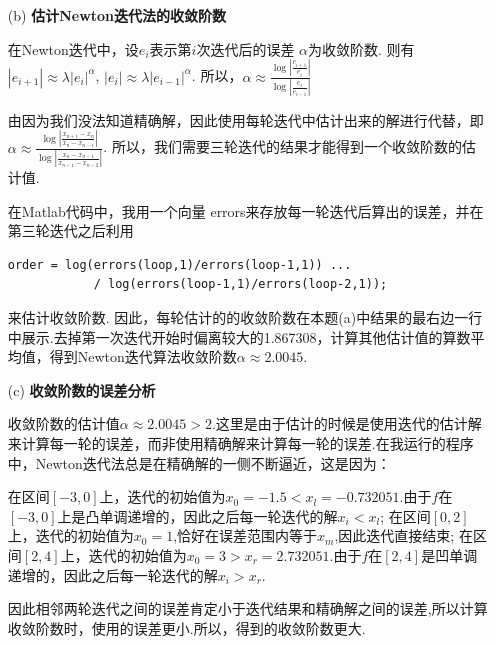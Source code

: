 \documentclass[12pt,a4paper,utf8]{ctexart}
\begin{document}
\begin{enumerate}
\begin{itemize}
    \item[(b)] \textbf{估计Newton迭代法的收敛阶数}
    \par
    在Newton迭代中，设$e_i$表示第$i$次迭代后的误差 $\alpha$为收敛阶数.
    则有 $ \left| e_{i+1} \right|  \approx \lambda { \left| e_{i} \right|} ^ \alpha$,
    $ \left| e_{i} \right|  \approx \lambda {\left| e_{i-1} \right|} ^ \alpha$.
    所以，$\alpha \approx \frac{ \log{ \left| \frac{e_{i+1}}{e_i} \right|} }
        { \log{ \left| \frac{e_{i}}{e_{i-1}} \right|} }$
    \par
    由因为我们没法知道精确解，因此使用每轮迭代中估计出来的解进行代替，即
    $\alpha \approx \frac{ \log{ \left| \frac{ x_{n+1} - x_n }{x_n - x_{n-1}} \right|} }
        { \log{ \left| \frac{x_n - x_{n-1}}{x_{n-1} - x_{n-2}} \right|} }$.
    所以，我们需要三轮迭代的结果才能得到一个收敛阶数的估计值.
    \par
    在Matlab代码中，我用一个向量
    errors来存放每一轮迭代后算出的误差，并在第三轮迭代之后利用
\begin{lstlisting}
order = log(errors(loop,1)/errors(loop-1,1)) ...
            / log(errors(loop-1,1)/errors(loop-2,1));
\end{lstlisting}
    来估计收敛阶数.
    因此，每轮估计的的收敛阶数在本题(a)中结果的最右边一行中展示.去掉第一次迭代开始时偏离较大的1.867308，计算其他估计值的算数平均值，得到Newton迭代算法收敛阶数$\alpha \approx 2.0045$.

    \item[(c)] \textbf{收敛阶数的误差分析}
    \par 
    收敛阶数的估计值$\alpha \approx 2.0045 > 2$.这里是由于估计的时候是使用迭代的估计解来计算每一轮的误差，而非使用精确解来计算每一轮的误差.在我运行的程序中，Newton迭代法总是在精确解的一侧不断逼近，这是因为：
    \par
    在区间$[-3,0]$上，迭代的初始值为$x_0 = -1.5 < x_l = -0.732051$.由于$f$在$[-3,0]$上是凸单调递增的，因此之后每一轮迭代的解$x_i < x_l$;
    在区间$[0,2]$上，迭代的初始值为$x_0 = 1$,恰好在误差范围内等于$x_m$,因此迭代直接结束;
    在区间$[2,4]$上，迭代的初始值为$x_0 = 3 > x_r = 2.732051$.由于$f$在$[2,4]$是凹单调递增的，因此之后每一轮迭代的解$x_i > x_r$.
    \par
    因此相邻两轮迭代之间的误差肯定小于迭代结果和精确解之间的误差,所以计算收敛阶数时，使用的误差更小.所以，得到的收敛阶数更大.
    \end{itemize}


\end{enumerate}
\end{document}
